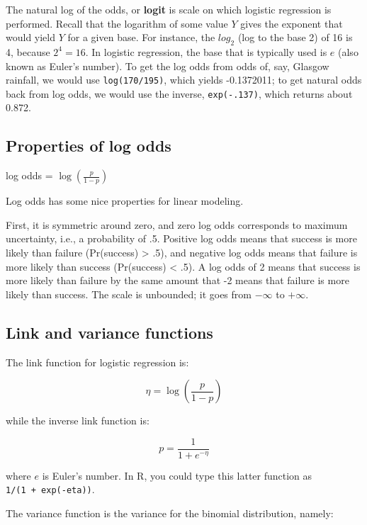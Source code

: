 \documentclass[]{book}
\begin{document}
The natural log of the odds, or \textbf{logit} is scale on which logistic regression is performed. Recall that the logarithm of some value \(Y\) gives the exponent that would yield \(Y\) for a given base. For instance, the \(log_2\) (log to the base 2) of 16 is 4, because \(2^4 = 16\). In logistic regression, the base that is typically used is \(e\) (also known as Euler's number). To get the log odds from odds of, say, Glasgow rainfall, we would use \texttt{log(170/195)}, which yields -0.1372011; to get natural odds back from log odds, we would use the inverse, \texttt{exp(-.137)}, which returns about 0.872.

\hypertarget{properties-of-log-odds}{%
\subsection{Properties of log odds}\label{properties-of-log-odds}}

log odds = \(\log \left(\frac{p}{1-p}\right)\)

Log odds has some nice properties for linear modeling.

First, it is symmetric around zero, and zero log odds corresponds to maximum uncertainty, i.e., a probability of .5. Positive log odds means that success is more likely than failure (Pr(success) \textgreater{} .5), and negative log odds means that failure is more likely than success (Pr(success) \textless{} .5). A log odds of 2 means that success is more likely than failure by the same amount that -2 means that failure is more likely than success. The scale is unbounded; it goes from \(-\infty\) to \(+\infty\).

\hypertarget{link-and-variance-functions}{%
\subsection{Link and variance functions}\label{link-and-variance-functions}}

The link function for logistic regression is:

\[\eta = \log \left(\frac{p}{1-p}\right)\]

while the inverse link function is:

\[p = \frac{1}{1 + e^{-\eta}}\]

where \(e\) is Euler's number. In R, you could type this latter function as \texttt{1/(1\ +\ exp(-eta))}.

The variance function is the variance for the binomial distribution, namely:
\end{document}
